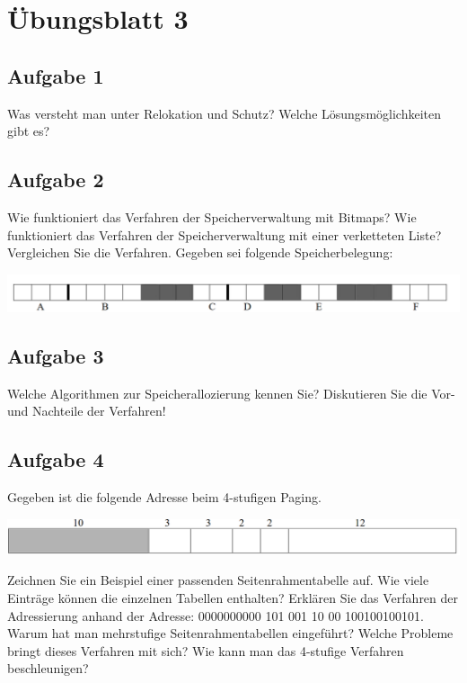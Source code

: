 \chapter{Übungsblatt 3}

\section{Aufgabe 1}

Was versteht man unter Relokation und Schutz? Welche Lösungsmöglichkeiten gibt es?

\section{Aufgabe 2}

Wie funktioniert das Verfahren der Speicherverwaltung mit Bitmaps? Wie funktioniert das Verfahren der Speicherverwaltung mit einer verketteten Liste? Vergleichen Sie die Verfahren. Gegeben sei folgende Speicherbelegung:

\includegraphics[width=\textwidth]{assets/uebungsblatt_3_task_2.png}

\section{Aufgabe 3}

Welche Algorithmen zur Speicherallozierung kennen Sie? Diskutieren Sie die Vor- und Nachteile der Verfahren!

\section{Aufgabe 4}

Gegeben ist die folgende Adresse beim 4-stufigen Paging.

\includegraphics[width=\textwidth]{assets/uebungsblatt_3_task_4.png}

Zeichnen Sie ein Beispiel einer passenden Seitenrahmentabelle auf. Wie viele Einträge können die einzelnen Tabellen enthalten? Erklären Sie das Verfahren der Adressierung anhand der Adresse: 0000000000 101 001 10 00 100100100101. Warum hat man mehrstufige Seitenrahmentabellen eingeführt? Welche Probleme bringt dieses Verfahren mit sich? Wie kann man das 4-stufige Verfahren beschleunigen?


